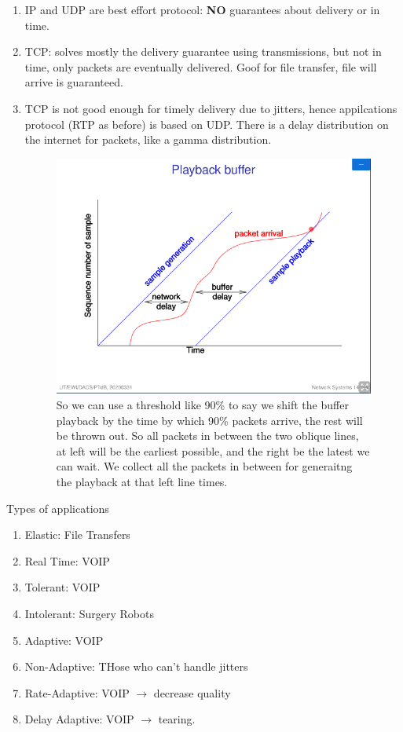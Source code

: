 \documentclass[11pt, a4paper]{article}
\begin{document}
\begin{enumerate}
    \item IP and UDP are best effort protocol: \textbf{NO} guarantees about delivery or in time.
    \item TCP: solves mostly the delivery guarantee using transmissions, but not in time, only packets are eventually delivered. Goof for file transfer, file will arrive is guaranteed.
    \item TCP is not good enough for timely delivery due to jitters, hence appilcations protocol (RTP as before) is based on UDP. There is a delay distribution on the internet for packets, like a gamma distribution.
    \begin{figure}[H]
        \centering
        \includegraphics{Pictures/RTP QOS.png}
        \caption{So we can use a threshold like 90\% to say we shift the buffer playback by the time by which 90\% packets arrive, the rest will be thrown out. So all packets in between the two oblique lines, at left will be the earliest possible, and the right be the latest we can wait. We collect all the packets in between for generaitng the playback at that left line times.}
        \label{fig:my_label}
    \end{figure}
\end{enumerate}

Types of applications
\begin{enumerate}
    \item Elastic: File Transfers
    \item Real Time: VOIP
    \item Tolerant: VOIP
    \item Intolerant: Surgery Robots
    \item Adaptive: VOIP
    \item Non-Adaptive: THose who can't handle jitters
    \item Rate-Adaptive: VOIP $\to$ decrease quality
    \item Delay Adaptive: VOIP $\to$ tearing.
\end{enumerate}
\end{document}

